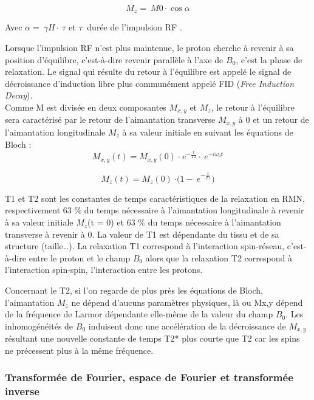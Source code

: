 \begin{equation}
\nonumber
	M_z =\ M0 \cdot \cos{\alpha}
\end{equation}

Avec $\alpha =\ \gamma H\cdot \ \tau$ et $\tau\ $ durée de l’impulsion RF \cite{Ernst1966}.

Lorsque l’impulsion RF n’est plus maintenue, le proton cherche à revenir à sa position d’équilibre, c’est-à-dire revenir parallèle à l’axe de  $B_0$, c’est la phase de relaxation. Le signal qui résulte du retour à l’équilibre est appelé le signal de décroissance d’induction libre plus communément appelé FID (\textit{Free Induction Decay}).
\\
Comme M est divisée en deux composantes $M_{x,y}$  et $M_z$, le retour à l’équilibre sera caractérisé par le retour de l’aimantation transverse $M_{x,y}$  à 0 et un retour de l’aimantation longitudinale $M_z$ à sa valeur initiale en suivant les équations de Bloch \cite{HolgerFrsterling2009}:
\begin{equation}
\nonumber
	M_{x,y}\left(t\right)=M_{x,y}\left(0\right)\ {\cdot\ e}^{-\frac{t}{T2}}\cdot\ e^{-i\omega_0t}
	\end{equation}

\begin{equation}
\nonumber
	M_z\left(t\right)=M_z\left(0\right)\ {\cdot(1-\ e}^{-\frac{t}{T1}})
	\end{equation}

T1 et T2 sont les constantes de temps caractéristiques de la relaxation en RMN, respectivement 63 $\%$ du temps nécessaire à l’aimantation longitudinale à revenir à sa valeur initiale $M_z$(t = 0) et 63 $\%$ du temps nécessaire à l’aimantation transverse à revenir à 0. La valeur de T1 est dépendante du tissu et de sa structure (taille…). La relaxation T1 correspond à l’interaction spin-réseau, c’est-à-dire entre le proton et le champ $B_0$ alors que la relaxation T2 correspond à l’interaction spin-spin, l’interaction entre les protons.

Concernant le T2, si l’on regarde de plus près les équations de Bloch, l’aimantation $M_z$ ne dépend d’aucuns paramètres physiques, là ou Mx,y dépend de la fréquence de Larmor dépendante elle-même de la valeur du champ  $B_0$. Les inhomogénéités de $B_0$ induisent donc une accélération de la décroissance de $M_{x,y}$  résultant une nouvelle constante de temps T2* plus courte que T2 car les spins ne précessent plus à la même fréquence.

\subsubsection{Transformée de Fourier, espace de Fourier et transformée inverse}

